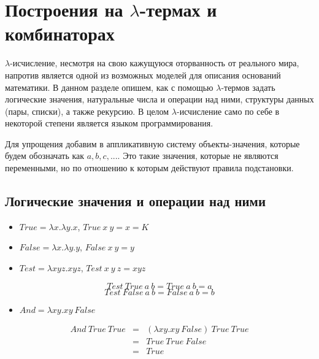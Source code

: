 \section{Построения на $\lambda$-термах и комбинаторах}

$\lambda$-исчисление, несмотря на свою кажущуюся оторванность от реального мира, напротив является одной из возможных моделей для описания оснований математики. В данном разделе опишем, как с помощью $\lambda$-термов задать логические значения, натуральные числа и операции над ними, структуры данных (пары, списки), а также рекурсию. В целом $\lambda$-исчисление само по себе в некоторой степени является языком программирования.

Для упрощения добавим в аппликативную систему объекты-значения, которые будем обозначать как $a, b, c, ...$. Это такие значения, которые не являются переменными, но по отношению к которым действуют правила подстановки.

\subsection*{Логические значения и операции над ними}

\begin{itemize}
    \item $True = \lambda x. \lambda y. x$, $True\ x\ y = x = K$
    \item $False = \lambda x. \lambda y. y$, $False\ x\ y = y$
    \item $Test = \lambda xyz.xyz$, $Test\ x\ y\ z = xyz$
\end{itemize}

\begin{equation*}
    Test\ True\ a\ b = True\ a\ b = a
\end{equation*}
\begin{equation*}
    Test\ False\ a\ b = False\ a\ b = b
\end{equation*}

\begin{itemize}
    \item $And = \lambda xy. xy\ False$
\end{itemize}

\begin{equation*}
    \begin{array}{rcl}
        And\ True\ True &=& (\lambda xy. xy\ False)\ True\ True \\ 
        &=& True\ True\ False \\
        &=& True
    \end{array}    
\end{equation*}

